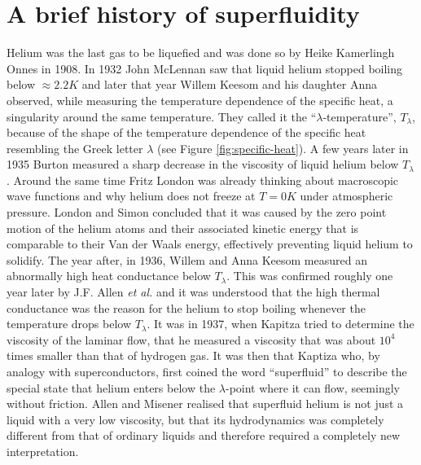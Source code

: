 	\section{A brief history of superfluidity}
		Helium was the last gas to be liquefied and was done so by Heike Kamerlingh Onnes in 1908\citep{Onnes1908,Onnes1909}. In 1932 John McLennan saw that liquid helium stopped boiling below $\approx\!2.2\unit{K}$\citep{McLennan1932} and later that year Willem Keesom and his daughter Anna observed, while measuring the temperature dependence of the specific heat, a singularity around the same temperature\citep{Keesom1932}. They called it the ``$\lambda$-temperature'',  $T_\lambda$, because of the shape of the temperature dependence of the specific heat resembling the Greek letter $\lambda$ (see Figure \ref{fig:specific-heat}). A few years later in 1935 Burton measured a sharp decrease in the viscosity of liquid helium below $T_\lambda$\citep{Burton1935}. Around the same time Fritz London was already thinking about macroscopic wave functions and why helium does not freeze at $T=0\unit{K}$ under atmospheric pressure\citep{London1935}. London and Simon concluded that it was caused by the zero point motion of the helium atoms and their associated kinetic energy that is comparable to their Van der Waals energy, effectively preventing liquid helium to solidify\citep{Simon1934,London1936}. The year after, in 1936, Willem and Anna Keesom measured an abnormally high heat conductance below $T_\lambda$\citep{Keesom1936}. This was confirmed roughly one year later by J.F. Allen \emph{et al.}\citep{Allen1937} and it was understood that the high thermal conductance was the reason for the helium to stop boiling whenever the temperature drops below $T_\lambda$. It was in 1937, when Kapitza tried to determine the viscosity of the laminar flow, that he measured a viscosity that was about $10^4$ times smaller than that of hydrogen gas\citep{Kapitza1938}. It was then that Kaptiza who, by analogy with superconductors, first coined the word ``superfluid''\citep{Kapitza1938} to describe the special state that helium enters below the $\lambda$-point where it can flow, seemingly without friction. Allen and Misener realised that superfluid helium is not just a liquid with a very low viscosity, but that its hydrodynamics was completely different from that of ordinary liquids\citep{Allen1938} and therefore required a completely new interpretation.
		
